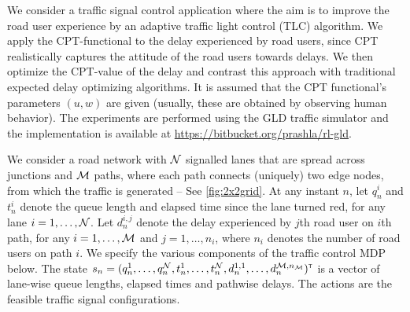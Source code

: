 We consider a traffic signal control application where the aim is to improve the road user experience by an adaptive traffic light control (TLC) algorithm.
We apply the CPT-functional to the delay experienced by road users, since CPT realistically captures the attitude of the road users towards delays. We then optimize the CPT-value of the delay and contrast this approach with traditional expected delay optimizing algorithms. It is assumed that the CPT functional's parameters $(u,w)$ are given (usually, these are obtained by observing human behavior). The experiments are performed using the GLD traffic simulator \cite{GLDSim} and the implementation is available at \url{https://bitbucket.org/prashla/rl-gld}.

We consider a road network with $\mathcal{N}$ signalled lanes that are spread across junctions and $\mathcal{M}$ paths, where each path connects (uniquely) two edge nodes, from which the traffic is generated -- See \cref{fig:2x2grid}. 
At any instant $n$, let $q_n^i$ and $t_n^i$ denote the queue length and elapsed time since the lane turned red, for any lane $i = 1,\ldots, \mathcal{N}$. Let $d_n^{i,j}$ denote the delay experienced by $j$th road user on $i$th path, for any $i=1,\ldots,\mathcal{M}$ and $j=1,\ldots,n_i$, where $n_i$ denotes the number of road users on path $i$.
We specify the various components of the traffic control MDP below.
The state $s_n=(q_n^1,\ldots,q_n^{\mathcal{N}},t_n^1,\ldots,t_n^{\mathcal{N}},d_n^{1,1},\ldots,d_n^{\mathcal{M},n_{\mathcal{M}}})^\mathsf{\scriptscriptstyle T}$ is a vector of lane-wise queue lengths, elapsed times and pathwise delays.
The actions are the feasible traffic signal configurations. 


